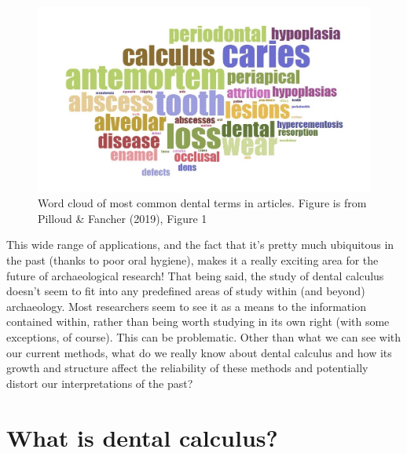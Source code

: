 \documentclass[
  letterpaper,
]{book}
\begin{document}
\begin{figure}

{\centering \includegraphics{figures/wordcloud.png}

}

\caption{\label{fig-dental-terms}Word cloud of most common dental terms
in articles. Figure is from Pilloud \& Fancher (2019), Figure 1}

\end{figure}

This wide range of applications, and the fact that it's pretty much
ubiquitous in the past (thanks to poor oral hygiene), makes it a really
exciting area for the future of archaeological research! That being
said, the study of dental calculus doesn't seem to fit into any
predefined areas of study within (and beyond) archaeology. Most
researchers seem to see it as a means to the information contained
within, rather than being worth studying in its own right (with some
exceptions, of course). This can be problematic. Other than what we can
see with our current methods, what do we really know about dental
calculus and how its growth and structure affect the reliability of
these methods and potentially distort our interpretations of the past?

\hypertarget{intro-what}{%
\section{What is dental calculus?}\label{intro-what}}
\end{document}
